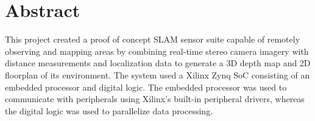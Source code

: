 {}
\section*{Abstract}


This project created a proof of concept SLAM sensor suite capable of remotely observing and mapping areas by combining real-time stereo camera imagery with distance measurements and localization data to generate a 3D depth map and 2D floorplan of its environment. The system used a Xilinx Zynq SoC consisting of an embedded processor and digital logic. The embedded processor was used to communicate with peripherals using Xilinx's built-in peripheral drivers, whereas the digital logic was used to parallelize data processing.